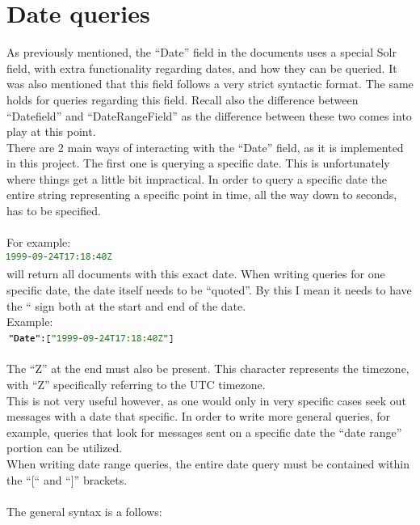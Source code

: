 \documentclass[a4paper,english]{report}
\begin{document}
\section{Date queries}

As previously mentioned, the “Date” field in the documents uses a special Solr field, with extra functionality regarding dates, and how they can be queried. It was also mentioned that this field follows a very strict syntactic format. The same holds for queries regarding this field. Recall also the difference between “Datefield” and “DateRangeField” as the difference between these two comes into play at this point.\\ 
There are 2 main ways of interacting with the “Date” field, as it is implemented in this project.
The first one is querying a specific date. This is unfortunately where things get a little bit impractical. In order to query a specific date the entire string representing a specific point in time, all the way down to seconds, has to be specified.\\\\
For example: \\

\includegraphics{date2}\\

will return all documents with this exact date.
When writing queries for one specific date, the date itself needs to be “quoted”. By this I mean it needs to have the “ sign both at the start and end of the date. \\
Example: \\ 


\includegraphics{date1}


The “Z” at the end must also be present. This character represents the timezone, with “Z” specifically referring to the UTC timezone.\\

This is not very useful however, as one would only in very specific cases seek out messages with a date that specific. In order to write more general queries, for example, queries that look for messages sent on a specific date the “date range” portion can be utilized.\\
When writing date range queries, the entire date query must be contained within the “[“ and  “]” brackets.  \\\\
The general syntax is a follows: \\
\end{document}
